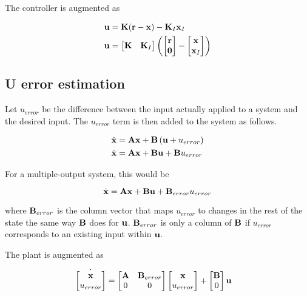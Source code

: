 The controller is augmented as

\begin{align*}
  \mathbf{u} &= \mathbf{K} (\mathbf{r} - \mathbf{x}) - \mathbf{K}_I\mathbf{x}_I \\
  \mathbf{u} &=
  \begin{bmatrix}
    \mathbf{K} & \mathbf{K}_I
  \end{bmatrix}
  \left(\begin{bmatrix}
    \mathbf{r} \\
    \mathbf{0}
  \end{bmatrix} -
  \begin{bmatrix}
    \mathbf{x} \\
    \mathbf{x}_I
  \end{bmatrix}\right)
\end{align*}

\subsection{U error estimation}

Let $u_{error}$ be the difference between the \gls{input} actually applied to a
\gls{system} and the desired \gls{input}. The $u_{error}$ term is then added to
the \gls{system} as follows.

\begin{align*}
  \dot{\mathbf{x}} &= \mathbf{A}\mathbf{x} + \mathbf{B}\left(\mathbf{u} + u_{error}\right) \\
  \dot{\mathbf{x}} &= \mathbf{A}\mathbf{x} + \mathbf{B}\mathbf{u} + \mathbf{B}u_{error}
\end{align*}

For a multiple-output \gls{system}, this would be

\begin{equation*}
  \dot{\mathbf{x}} = \mathbf{A}\mathbf{x} + \mathbf{B}\mathbf{u} + \mathbf{B}_{error}u_{error}
\end{equation*}

where $\mathbf{B}_{error}$ is the column vector that maps $u_{error}$ to changes in
the rest of the \gls{state} the same way $\mathbf{B}$ does for $\mathbf{u}$.
$\mathbf{B}_{error}$ is only a column of $\mathbf{B}$ if $u_{error}$ corresponds to an
existing \gls{input} within $\mathbf{u}$.

The \gls{plant} is augmented as

\begin{align*}
  \dot{\begin{bmatrix}
    \mathbf{x} \\
    u_{error}
  \end{bmatrix}} &=
  \begin{bmatrix}
    \mathbf{A} & \mathbf{B}_{error} \\
    0 & 0
  \end{bmatrix}
  \begin{bmatrix}
    \mathbf{x} \\
    u_{error}
  \end{bmatrix} +
  \begin{bmatrix}
    \mathbf{B} \\
    0
  \end{bmatrix}
  \mathbf{u}
\end{align*}

